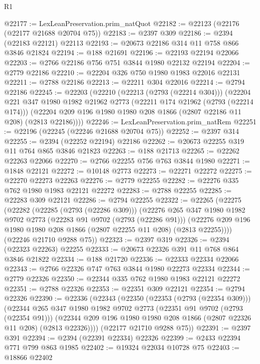 \begin{lexlean}{R1}
\begin{coremodule}
@22177 := LexLeanPreservation.prim_natQuot
@22182 := @22123 (@22176 (@22177 @21688 @20704 @75))
@22183 := @2397 @309
@22186 := @2394 (@22183 @22121) @22113
@22193 := @20673 @22186 @314 @11 @758 @866 @3846 @21824
@22194 := @188 @21691
@22196 := @22193 @22194 @22066
@22203 := @2766 @22186 @756 @751 @3844 @1980 @22132 @22194
@22204 := @2779 @22186
@22210 := @22204 @326 @750 @1980 @1983 @22016 @22131
@22211 := @2788 @22186
@22213 := @22211 @304 @22016
@22214 := @2794 @22186
@22245 := @22203
    (@22210
      (@22213 (@2793 (@22214 @304)))
      (@22204
        @221
        @347
        @1980
        @1982
        @21962
        @2773
        (@22211 @174 @21962 (@2793 (@22214 @174)))
        (@22204 @209 @196 @1980 @1980 @208 @1866 (@2807 @22186 @11 @208) (@2813 @22186))))
@22246 := LexLeanPreservation.prim_natRem
@22251 := @22196 (@22245 (@22246 @21688 @20704 @75))
@22252 := @2397 @314
@22255 := @2394 (@22252 @22194) @22186
@22262 := @20673 @22255 @319 @11 @764 @865 @3846 @21823
@22263 := @188 @21713
@22265 := @22262 @22263 @22066
@22270 := @2766 @22255 @756 @763 @3844 @1980
@22271 := @1848 @22121
@22272 := @10148 @2773
@22273 := @22271 @22272
@22275 := @22270 @22273 @22263
@22276 := @2779 @22255
@22282 := @22276 @335 @762 @1980 @1983 @22121 @22272
@22283 := @2788 @22255
@22285 := @22283 @309 @22121
@22286 := @2794 @22255
@22322 := @22265
    (@22275
      (@22282
        (@22285 (@2793 (@22286 @309)))
        (@22276
          @265
          @347
          @1980
          @1982
          @9702
          @2773
          (@22283 @91 @9702 (@2793 (@22286 @91)))
          (@22276 @209 @196 @1980 @1980 @208 @1866 (@2807 @22255 @11 @208) (@2813 @22255))))
      (@22246 @21710 @9288 @75))
@22323 := @2397 @319
@22326 := @2394 (@22323 @22263) @22255
@22333 := @20673 @22326 @391 @11 @768 @864 @3846 @21822
@22334 := @188 @21720
@22336 := @22333 @22334 @22066
@22343 := @2766 @22326 @747 @763 @3844 @1980 @22273 @22334
@22344 := @2779 @22326
@22350 := @22344 @335 @762 @1980 @1983 @22121 @22272
@22351 := @2788 @22326
@22353 := @22351 @309 @22121
@22354 := @2794 @22326
@22390 := @22336
    (@22343
      (@22350
        (@22353 (@2793 (@22354 @309)))
        (@22344
          @265
          @347
          @1980
          @1982
          @9702
          @2773
          (@22351 @91 @9702 (@2793 (@22354 @91)))
          (@22344 @209 @196 @1980 @1980 @208 @1866 (@2807 @22326 @11 @208) (@2813 @22326))))
      (@22177 @21710 @9288 @75))
@22391 := @2397 @391
@22394 := @2394 (@22391 @22334) @22326
@22399 := @2433 @22394 @771 @799 @863 @1985
@22402 := @19324 @22034 @10728 @75
@22403 := @18866 @22402

\end{coremodule}
\end{lexlean}
